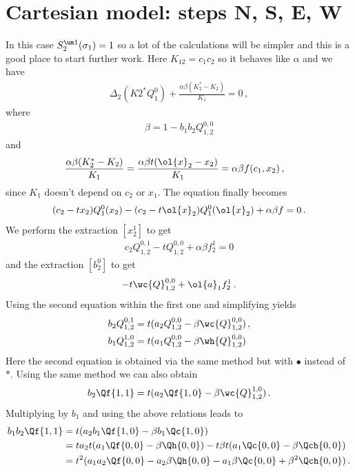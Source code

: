 \section{Cartesian model: steps N, S, E, W}
In this case $S_2^{\um 1}(\sigma_1) = 1$ so a lot of the calculations will be simpler and this is a good place to start further work. Here $K_{12} = c_1c_2$ so it behaves like $\alpha$ and we have
\begin{align}
	\Delta_2(K2^\ast Q_1^0) + \frac{\alpha\beta(K_2^\ast-K_2)}{K_1}=0\,,
\end{align}
where
\begin{align}
	\beta =  1-b_1b_2 Q_{1,2}^{0,0}
\end{align}
and
\begin{align}
	\frac{\alpha\beta(K_2^\ast -K_2)}{K_1}  &= \frac{\alpha\beta t (\ol{x}_2 - x_2)}{K_1} = \alpha\beta f(c_1,x_2)\,,
\end{align}
since $K_1$ doesn't depend on $c_2$ or $x_1$. The equation finally becomes
\begin{align}
	(c_2-tx_2)Q_1^0(x_2) - (c_2-t\ol{x}_2)Q_1^0(\ol{x}_2) + \alpha\beta f = 0\,.
\end{align}
We perform the extraction $[x_2^1]$ to get
\begin{align}
	c_2Q_{1,2}^{0,1}-t Q_{1,2}^{0,0} + \alpha\beta f_2^1 = 0
\end{align}
and the extraction $[b_2^0]$ to get
\begin{align}
	- t \wc{Q}_{1,2}^{0,0} +  \ol{a}_1f_2^1\,.
\end{align}
Using the second equation within the first one and simplifying yields
\begin{align}
	b_2 Q_{1,2}^{0,1} &= t(a_2 Q_{1,2}^{0,0} - \beta \wc{Q}_{1,2}^{0,0})\,,\\
	b_1 Q_{1,2}^{1,0} &= t(a_1 Q_{1,2}^{0,0} - \beta \wh{Q}_{1,2}^{0,0})
\end{align}
Here the second equation is obtained via the same method but with $\bullet$ instead of $\ast$. Using the same method we can also obtain
\begin{align}
	b_2 \Qf{1,1} = t(a_2 \Qf{1,0}-\beta \wc{Q}_{1,2}^{1,0})\,.
\end{align}
Multiplying by $b_1$ and using the above relations leads to
\begin{align}
\begin{split}
	b_1b_2 \Qf{1,1} &= t(a_2b_1\Qf{1,0}-\beta b_1 \Qc{1,0})\\
			      &=t a_2t(a_1\Qf{0,0}-\beta \Qh{0,0})-t\beta t(a_1\Qc{0,0}-\beta\Qch{0,0})\\	
			      &=t^2(a_1a_2\Qf{0,0}-a_2\beta\Qh{0,0}-a_1\beta\Qc{0,0}+\beta^2\Qch{0,0})\,.
\end{split}
\end{align}
